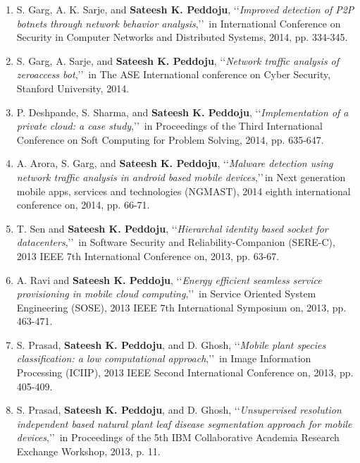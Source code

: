 \begin{enumerate}[label=(C\arabic*).]
	\item
	S. Garg, A. K. Sarje, and \textbf{Sateesh K. Peddoju}, \lq\lq \textit{Improved detection of P2P botnets through network behavior analysis},\rq\rq\, in International Conference on Security in Computer Networks and Distributed Systems, 2014, pp. 334-345.
	
	\item
	S. Garg, A. Sarje, and \textbf{Sateesh K. Peddoju}, \lq\lq \textit{Network traffic analysis of zeroaccess bot},\rq\rq\, in The ASE International conference on Cyber Security, Stanford University, 2014.
	
	\item
	P. Deshpande, S. Sharma, and \textbf{Sateesh K. Peddoju}, \lq\lq \textit{Implementation of a private cloud: a case study},\rq\rq\, in Proceedings of the Third International Conference on Soft Computing for Problem Solving, 2014, pp. 635-647.
	
	\item
	A. Arora, S. Garg, and \textbf{Sateesh K. Peddoju}, \lq\lq \textit{Malware detection using network traffic analysis in android based mobile devices},\rq\rq\,in Next generation mobile apps, services and technologies (NGMAST), 2014 eighth international conference on, 2014, pp. 66-71.
	
	\item
	T. Sen and \textbf{Sateesh K. Peddoju}, \lq\lq \textit{Hierarchal identity based socket for datacenters},\rq\rq\, in Software Security and Reliability-Companion (SERE-C), 2013 IEEE 7th International Conference on, 2013, pp. 63-67.
	
	\item
	A. Ravi and \textbf{Sateesh K. Peddoju}, \lq\lq \textit{Energy efficient seamless service provisioning in mobile cloud computing},\rq\rq\, in Service Oriented System Engineering (SOSE), 2013 IEEE 7th International Symposium on, 2013, pp. 463-471.
	
	\item
	S. Prasad, \textbf{Sateesh K. Peddoju}, and D. Ghosh, \lq\lq \textit{Mobile plant species classification: a low computational approach},\rq\rq\, in Image Information Processing (ICIIP), 2013 IEEE Second International Conference on, 2013, pp. 405-409.
	
	\item
	S. Prasad, \textbf{Sateesh K. Peddoju}, and D. Ghosh, \lq\lq \textit{Unsupervised resolution independent based natural plant leaf disease segmentation approach for mobile devices},\rq\rq\, in Proceedings of the 5th IBM Collaborative Academia Research Exchange Workshop, 2013, p. 11.
	

\end{enumerate}
